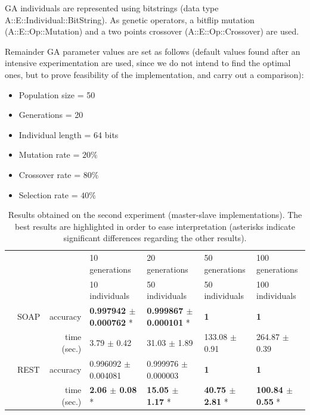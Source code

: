 \documentclass[final,1p,times]{elsarticle}
\begin{document}
GA individuals are represented using bitstrings (data type {\sf A::E::Individual::BitString}). 
As genetic operators, a bitflip mutation ({\sf A::E::Op::Mutation}) and a two points crossover ({\sf A::E::Op::Crossover}) are used.

Remainder GA parameter values are set as follows (default values found after an intensive experimentation are used, since we do not intend to find the optimal ones, but to prove feasibility of the implementation, and carry out a comparison):

\begin{itemize}
   \item Population size = 50
   \item Generations = 20
   \item Individual length = 64 bits
   \item Mutation rate = $20\%$
   \item Crossover rate = $80\%$
   \item Selection rate = $40\%$
\end{itemize}


\begin{table}[!ht]
\small{
\begin{tabular}{|l|r|l|l|l|l|}
\hline 
\multicolumn{2}{|c|}{}               &   10 generations        & 20 generations           & 50 generations           & 100 generations    \\
\multicolumn{2}{|c|}{}               &   10 individuals        & 50 individuals           & 50 individuals           & 100 individuals    \\
\hline
\ \ SOAP&accuracy     & \textbf{0.997942 $\pm$ 0.000762} * &\textbf{0.999867 $\pm$ 0.000101} *   &\textbf{1}                         &\textbf{1}    \\
             &time (sec.)  & 3.79 $\pm$ 0.42         &31.03 $\pm$ 1.89          &133.08 $\pm$ 0.91         &264.87 $\pm$ 0.39       \\
\hline
\ \ REST&accuracy     & 0.996092 $\pm$ 0.004081 &0.999976 $\pm$ 0.000003   &\textbf{1}                         &\textbf{1}     \\
             &time (sec.)  & \textbf{2.06 $\pm$ 0.08} *   &\textbf{15.05 $\pm$ 1.17} *          &\textbf{40.75 $\pm$ 2.81} *          &\textbf{100.84 $\pm$ 0.55} *       \\
\hline
\end{tabular}
}
\caption{Results obtained on the second experiment (master-slave implementations). The best results are highlighted in order to ease interpretation (asterisks indicate significant differences regarding the other results). 
\label{tabla:exp2} }
\end{table}
\end{document}
